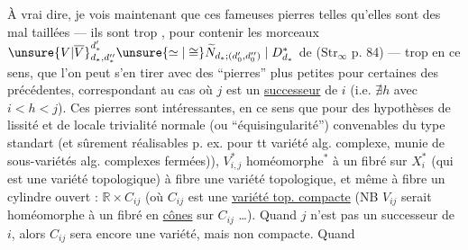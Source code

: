 À vrai dire, je vois maintenant que ces fameuses pierres telles qu'elles sont des  mal taillées — ils sont trop ,  pour contenir les morceaux $\unsure{V|\overline V}_{d_*,d''_*}^{d'_*}\unsure{\simeq|\cong}\widetilde N_{d_*;(d'_0,d''_0)}\mid D_{d_*}^*$ de ($\mathrm{Str}_\infty$ p. 84) — trop en ce sens, que l'on peut s'en tirer avec des ``pierres'' plus petites pour certaines des précédentes, correspondant au cas où $j$ est un \uline{successeur} de $i$ (i.e. $\nexists h$ avec $i<h<j$).
Ces pierres sont  intéressantes, en ce sens que pour des hypothèses de lissité et de locale trivialité normale (ou ``équisingularité'') convenables du type standart (et sûrement réalisables p. ex. pour tt variété alg. complexe, munie de sous-variétés alg. complexes fermées)), $V_{i,j}^*$  homéomorphe${}^*$ à un fibré sur $X_i^*$ (qui est une variété topologique) à fibre une variété topologique, et même à fibre un cylindre ouvert : $\mathbb R\times C_{ij}$  (où $C_{ij}$ est une \uline{variété top. compacte} (NB $V_{ij}$ serait homéomorphe à un fibré en \uline{cônes} sur $C_{ij}$ \ldots). Quand $j$ n'est pas un successeur de $i$, alors $C_{ij}$ sera encore une variété, mais non compacte. Quand



